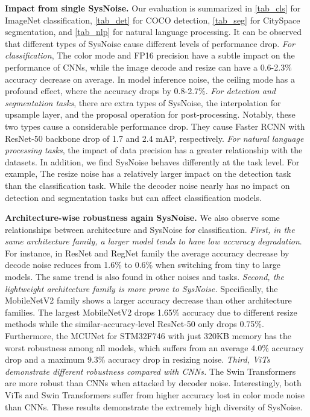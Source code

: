 \textbf{Impact from single SysNoise.}
Our evaluation is summarized in \autoref{tab_cls} for ImageNet classification, \autoref{tab_det} for COCO detection, \autoref{tab_seg} for CitySpace segmentation, and \autoref{tab_nlp} for natural language processing. It can be observed that different types of SysNoise cause different levels of performance drop. \emph{For classification}, The color mode and FP16 precision have a subtle impact on the performance of CNNs, while the image decode and resize can have a 0.6-2.3\% accuracy decrease on average. In model inference noise, the ceiling mode has a profound effect, where the accuracy drops by 0.8-2.7\%. \emph{For detection and segmentation tasks}, there are extra types of SysNoise, the interpolation for upsample layer, and the proposal operation for post-processing. 
Notably, these two types cause a considerable performance drop. They cause Faster RCNN with ResNet-50 backbone drop of 1.7 and 2.4 mAP, respectively. 
\emph{For natural language processing tasks}, the impact of data precision has a greater relationship with the datasets.
In addition, we find SysNoise behaves differently at the task level. For example, The resize noise has a relatively larger impact on the detection task than the classification task. While the decoder noise nearly has no impact on detection and segmentation tasks but can affect classification models. 

\textbf{Architecture-wise robustness again SysNoise.}
We also observe some relationships between architecture and SysNoise for classification. 
\textit{First, in the same architecture family, a larger model tends to have low accuracy degradation}. For instance, in ResNet and RegNet family the average accuracy decrease by decode noise reduces from 1.6\% to 0.6\% when switching from tiny to large models. The same trend is also found in other noises and tasks.
\textit{Second, the lightweight architecture family is more prone to SysNoise.} Specifically, the MobileNetV2 family shows a larger accuracy decrease than other architecture families.
The largest MobileNetV2 drops 1.65\% accuracy due to different resize methods while the similar-accuracy-level ResNet-50 only drops 0.75\%. 
Furthermore, the MCUNet for STM32F746 with just 320KB memory has the worst robustness among all models, which suffers from an average 4.0\% accuracy drop and a maximum 9.3\% accuracy drop in resizing noise.
\textit{Third, ViTs demonstrate different robustness compared with CNNs.} The Swin Transformers are more robust than CNNs when attacked by decoder noise. Interestingly, both ViTs and Swin Transformers suffer from higher accuracy lost in color mode noise than CNNs. These results demonstrate the extremely high diversity of SysNoise. 

